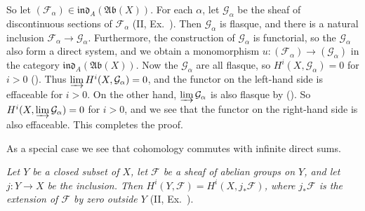 {So let $(\mathcal F_\alpha)\in\mathfrak{ind}_A(\mathfrak{Ab}(X))$. For each $\alpha$, let $\mathcal G_\alpha$ be the sheaf of discontinuous sections of $\mathcal F_\alpha$ (II, Ex.~). Then $\mathcal G_\alpha$ is flasque, and there is a natural inclusion $\mathcal F_\alpha\to\mathcal G_\alpha$. Furthermore, the construction of $\mathcal G_\alpha$ is functorial, so the $\mathcal G_\alpha$ also form a direct system, and we obtain a monomorphism $u\colon(\mathcal F_\alpha)\to(\mathcal G_\alpha)$ in the category $\mathfrak{ind}_A(\mathfrak{Ab}(X))$. Now the $\mathcal G_\alpha$ are all flasque, so $H^i(X,\mathcal G_\alpha)=0$ for $i>0$ (). Thus $\varinjlim H^i(X,\mathcal G_\alpha)=0$, and the functor on the left-hand side is effaceable for $i>0$. On the other hand, $\varinjlim\mathcal G_\alpha$ is also flasque by (). So $H^i(X,\varinjlim\mathcal G_\alpha)=0$ for $i>0$, and we see that the functor on the right-hand side is also effaceable. This completes the proof.

 As a special case we see that cohomology commutes with infinite direct sums.

 \emph{Let $Y$ be a closed subset of $X$, let $\mathcal F$ be a sheaf of abelian groups on $Y$, and let $j\colon Y\to X$ be the inclusion. Then $H^i(Y,\mathcal F)=H^i(X,j_*\mathcal F)$, where $j_*\mathcal F$ is the extension of $\mathcal F$ by zero outside $Y$} (II, Ex.~).
}
